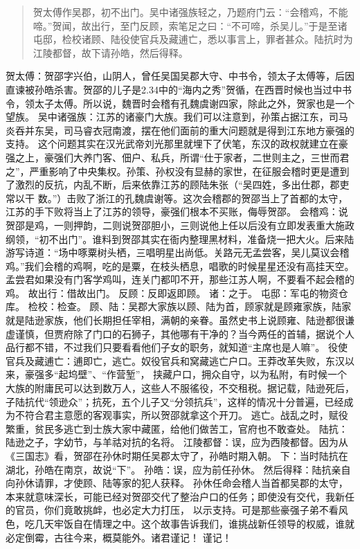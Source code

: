 \documentclass[]{book}
\begin{document}
\begin{quote}
贺太傅作吴郡，初不出门。吴中诸强族轻之，乃题府门云：``会稽鸡，不能啼。''贺闻，故出行，至门反顾，索笔足之曰：``不可啼，杀吴儿。''于是至诸屯邸，检校诸顾、陆役使官兵及藏逋亡，悉以事言上，罪者甚众。陆抗时为江陵都督，故下请孙皓，然后得释。
\end{quote}

贺太傅：贺邵字兴伯，山阴人，曾任吴国吴郡大守、中书令，领太子太傅等，后因直谏被孙皓杀害。贺邵的儿子是2.34中的``海内之秀''贺循，在西晋时候也当过中书令，领太子太傅。所以说，魏晋时会稽有孔魏虞谢四家，除此之外，贺家也是一个望族。
吴中诸强族：江苏的诸豪门大族。我们可以注意到，孙策占据江东，司马炎吞并东吴，司马睿衣冠南渡，摆在他们面前的重大问题就是得到江东地方豪强的支持。
这个问题其实在汉光武帝刘光那里就埋下了伏笔，东汉的政权就建立在豪强之上，豪强们大养门客、佃户、私兵，所谓``仕于家者，二世则主之，三世而君之''，严重影响了中央集权。孙策、孙权没有显赫的家世，在征服会稽时更是遭到了激烈的反抗，内乱不断，后来依靠江苏的顾陆朱张（``吴四姓，多出仕郡，郡吏常以干
数。''）击败了浙江的孔魏虞谢等。这次会稽郡的贺邵当上了首都的太守，江苏的手下败将当上了江苏的领导，豪强们根本不买账，侮辱贺邵。
会稽鸡：说贺邵是鸡，一则押韵，二则说贺邵胆小，三则说他上任以后没有立即发表重大施政纲领，``初不出门''。谁料到贺邵其实在衙内整理黑材料，准备烧一把大火。后来陆游写诗道：``场中啄粟树头栖，三唱明星出尚低。关路元无孟尝客，吴儿莫议会稽鸡。''我们会稽的鸡啊，吃的是粟，在枝头栖息，唱歌的时候星星还没有高挂天空。孟尝君如果没有门客学鸡叫，连关门都叩不开，那些江苏人啊，不要看不起会稽的鸡。
故出行：借故出门。 反顾：反即返即顾。 诸：之于。 屯邸：军屯的物资仓库。
检校：检查。
顾、陆：吴郡大家族以顾、陆为首，顾家就是顾雍家族，陆家就是陆逊家族，他们长期担任宰相，满朝的亲眷。虽然史书上说顾雍、陆逊都很谦虚谨慎，但贾府除了门口的石狮子，其他哪有干净的？当今两任的首辅，据说个人品行都不错，不过我们只要看看他们子女的职务，就知道``主席也是人嘛''。
役使官兵及藏逋亡：逋即亡，逃亡。奴役官兵和窝藏逃亡户口。王莽改革失败，东汉以来，豪强多``起坞壁''、``作营堑''，
挟藏户口，拥众自守，以为私附，有时候一个大族的附庸民可以达到数万人，这些人不服徭役，不交租税。据记载，陆逊死后，子陆抗代``领逊众''；抗死，五个儿子又``分领抗兵''，这样的情况十分普遍，已经成为不符合君主意愿的客观事实，所以贺邵就拿这个开刀。
逃亡。战乱之时，赋役繁重，贫民多逃亡到士族大家中藏匿，给他们做苦工，官府也不敢查处。
陆抗：陆逊之子，字幼节，与羊祜对抗的名将。
江陵都督：误，应为西陵都督。因为从《三国志》看，贺邵在孙休时期任吴郡太守了，孙皓时期入朝。
下：当时陆抗在湖北，孙皓在南京，故说``下''。 孙皓：误，应为前任孙休。
然后得释：陆抗亲自向孙休请罪，才使顾、陆等家的犯人获释。
孙休任命会稽人当首都吴郡的太守，本来就意味深长，可能已经对贺邵交代了整治户口的任务；即使没有交代，我新任的官员，你们竟敢挑衅，也必定大力打压，
以示支持。可是那些豪强子弟不看风色，吃几天牢饭自在情理之中。这个故事告诉我们，谁挑战新任领导的权威，谁就必定倒霉，古往今来，概莫能外。诸君谨记！
谨记！
\end{document}

